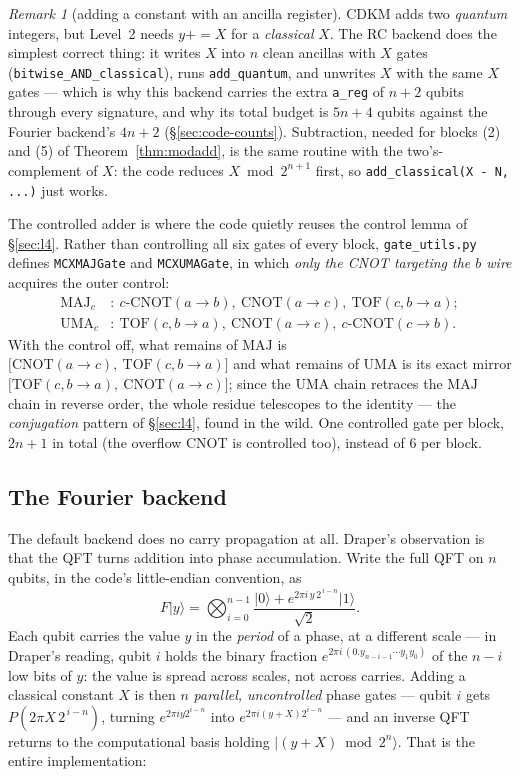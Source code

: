 \documentclass[11pt]{article}
\renewcommand{\ket}[1]{\lvert #1 \rangle}
\newcommand{\MAJ}{\mathrm{MAJ}}
\newcommand{\UMA}{\mathrm{UMA}}
\newcommand{\TOF}{\mathrm{TOF}}
\newcommand{\CNOT}{\mathrm{CNOT}}
\newcommand{\code}[1]{\texttt{#1}}
\theoremstyle{plain}
\theoremstyle{remark}
\newtheorem*{remark}{Remark}
\begin{document}
\begin{remark}[adding a constant with an ancilla register]
CDKM adds two \emph{quantum} integers, but Level~2 needs $y\mathbin{+{=}}X$ for a \emph{classical}
$X$. The RC backend does the simplest correct thing: it writes $X$ into $n$ clean ancillas with
$X$ gates (\code{bitwise\_AND\_classical}), runs \code{add\_quantum}, and unwrites $X$ with the
same $X$ gates --- which is why this backend carries the extra \code{a\_reg} of $n+2$ qubits
through every signature, and why its total budget is $5n+4$ qubits against the Fourier backend's
$4n+2$ (\S\ref{sec:code-counts}). Subtraction, needed for blocks (2) and (5) of
Theorem~\ref{thm:modadd}, is the same routine with the two's-complement of $X$: the code reduces
$X\bmod 2^{n+1}$ first, so \code{add\_classical(X - N, ...)} just works.
\end{remark}

\noindent
The controlled adder is where the code quietly reuses the control lemma of \S\ref{sec:l4}. Rather
than controlling all six gates of every block, \code{gate\_utils.py} defines \code{MCXMAJGate} and
\code{MCXUMAGate}, in which \emph{only the CNOT targeting the $b$ wire} acquires the outer control:
\begin{align*}
\MAJ_c&:\ c\text{-}\CNOT(a\!\to\!b),\ \CNOT(a\!\to\!c),\ \TOF(c,b\!\to\!a);\\
\UMA_c&:\ \TOF(c,b\!\to\!a),\ \CNOT(a\!\to\!c),\ c\text{-}\CNOT(c\!\to\!b).
\end{align*}
With the control off, what remains of $\MAJ$ is $\big[\CNOT(a\!\to\!c),\ \TOF(c,b\!\to\!a)\big]$
and what remains of $\UMA$ is its exact mirror $\big[\TOF(c,b\!\to\!a),\ \CNOT(a\!\to\!c)\big]$;
since the $\UMA$ chain retraces the $\MAJ$ chain in reverse order, the whole residue telescopes to
the identity --- the \emph{conjugation} pattern of \S\ref{sec:l4}, found in the wild. One controlled
gate per block, $2n{+}1$ in total (the overflow CNOT is controlled too), instead of $6$ per block.

\subsection{The Fourier backend}\label{sec:code-qft}

The default backend does no carry propagation at all. Draper's observation \cite{draper} is that
the QFT turns addition into phase accumulation. Write the full QFT on $n$ qubits, in the code's
little-endian convention, as
\[
F\ket y=\bigotimes_{i=0}^{n-1}\frac{\ket0+e^{2\pi i\,y\,2^{\,i-n}}\ket1}{\sqrt2}.
\]
Each qubit carries the value $y$ in the \emph{period} of a phase, at a different scale --- in
Draper's reading, qubit $i$ holds the binary fraction $e^{2\pi i\,(0.y_{n-i-1}\cdots y_1y_0)}$ of
the $n{-}i$ low bits of $y$: the value is spread across scales, not across carries. Adding a
classical constant $X$ is then $n$ \emph{parallel, uncontrolled} phase gates --- qubit $i$ gets
$P(2\pi X\,2^{\,i-n})$, turning $e^{2\pi iy2^{i-n}}$ into $e^{2\pi i(y+X)2^{i-n}}$ --- and an
inverse QFT returns to the computational basis holding $\ket{(y+X)\bmod2^n}$. That is the entire
implementation:
\end{document}
